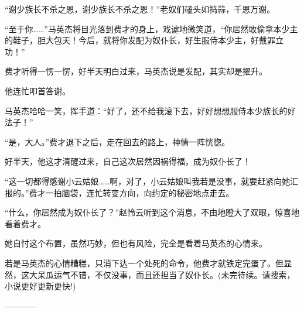 \begin{this_body}
“谢少族长不杀之恩，谢少族长不杀之恩！”老奴们磕头如捣蒜，千恩万谢。

“至于你……”马英杰将目光落到费才的身上，戏谑地微笑道，“你居然敢偷拿本少主的鞋子，胆大包天！今后，就将你发配为奴仆长，好生服侍本少主，好戴罪立功！”

费才听得一愣一愣，好半天明白过来，马英杰说是发配，其实却是擢升。

他连忙叩首答谢。

马英杰哈哈一笑，挥手道：“好了，还不给我滚下去，好好想想服侍本少族长的好法子！”

“是，大人。”费才退下之后，走在回去的路上，神情一阵恍惚。

好半天，他这才清醒过来，自己这次居然因祸得福，成为奴仆长了！

“这一切都得感谢小云姑娘……啊，对了，小云姑娘叫我若是没事，就要赶紧向她汇报的。”费才一拍脑袋，连忙转变方向，向约定的秘密地点走去。

“什么，你居然成为奴仆长了？”赵怜云听到这个消息，不由地瞪大了双眼，惊喜地看着费才。

她自忖这个布置，虽然巧妙，但也有风险，完全是看着马英杰的心情来。

若是马英杰的心情糟糕，只消下达一个处死的命令，他费才就铁定完蛋了。但显然，这大呆瓜运气不错，不仅没事，而且还担当了奴仆长。(未完待续。请搜索，小说更好更新更快!)

------------

\end{this_body}

